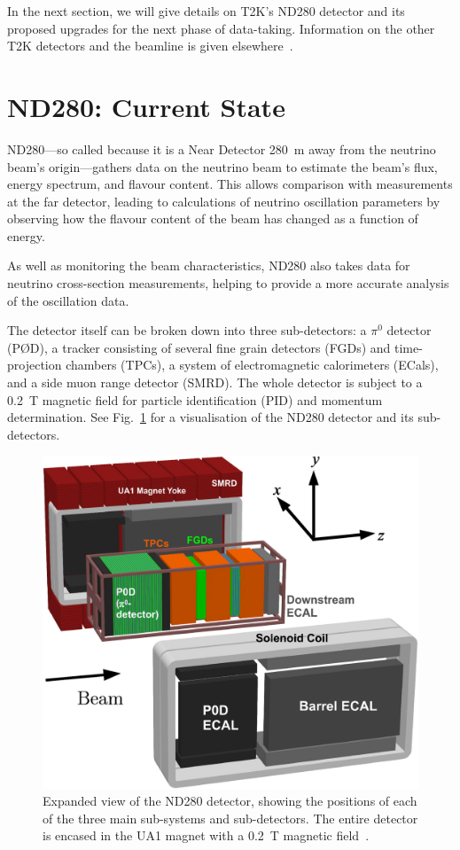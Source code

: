 \documentclass[aps,pra,12pt,notitlepage,tightenlines]{revtex4-1}
\begin{document}
In the next section, we will give details on T2K's ND280 detector and its proposed upgrades for the next phase of data-taking. Information on the other T2K detectors and the beamline is given elsewhere~\cite{ABE2011106}.

\section{ND280: Current State}
ND280---so called because it is a Near Detector 280~m away from the neutrino beam's origin---gathers data on the neutrino beam to estimate the beam's flux, energy spectrum, and flavour content. This allows comparison with measurements at the far detector, leading to calculations of neutrino oscillation parameters by observing how the flavour content of the beam has changed as a function of energy. 

As well as monitoring the beam characteristics, ND280 also takes data for neutrino cross-section measurements, helping to provide a more accurate analysis of the oscillation data. 

The detector itself can be broken down into three sub-detectors: a $\pi^0$ detector (P\O D), a tracker consisting of several fine grain detectors (FGDs) and time-projection chambers (TPCs), a system of electromagnetic calorimeters (ECals), and a side muon range detector (SMRD). The whole detector is subject to a 0.2~T magnetic field for particle identification (PID) and momentum determination. See Fig.\ \ref{fig:ND} for a visualisation of the ND280 detector and its sub-detectors.
\begin{figure}
 \includegraphics[scale=1]{ND280.png}
 \caption{Expanded view of the ND280 detector, showing the positions of each of the three main sub-systems and sub-detectors. The entire detector is encased in the UA1 magnet with a 0.2~T magnetic field~\cite{ABE2011106}.}
 \label{fig:ND}
\end{figure}
\end{document}
